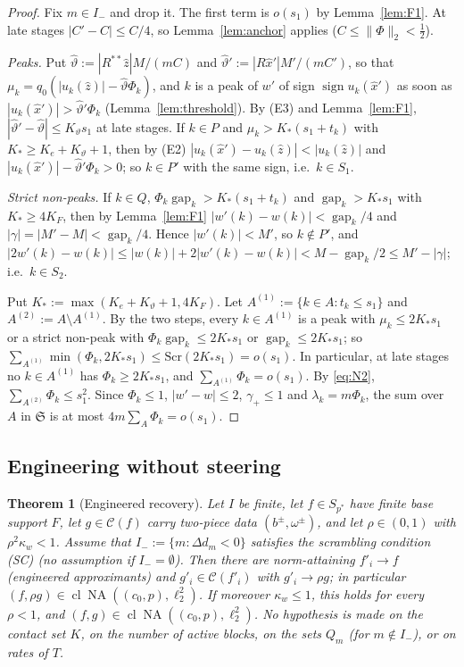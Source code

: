 \documentclass[10pt]{amsart}
\newtheorem{theorem}{Theorem}[section]
\theoremstyle{definition}
\theoremstyle{remark}
\newcommand{\NA}{\operatorname{NA}}
\newcommand{\sgn}{\operatorname{sign}}
\newcommand{\Cset}{\mathcal C}
\newcommand{\cl}{\operatorname{cl}}
\newcommand{\gap}{\operatorname{gap}}
\newcommand{\zh}{\hat z}
\begin{document}
\begin{proof}
Fix $m\in I_-$ and drop it.  The first term is $o(s_1)$ by
Lemma~\ref{lem:F1}.  At late stages $|C'-C|\le C/4$, so
Lemma~\ref{lem:anchor} applies ($C\le\|\Phi\|_2<\frac12$).

\emph{Peaks.}  Put $\hat\vartheta:=|R^{**}\zh|M/(mC)$ and $\hat\vartheta':=
|R\hat x'|M'/(mC')$, so that $\mu_k=q_0(|u_k(\zh)|-\hat\vartheta\Phi_k)$, and
$k$ is a peak of $w'$ of sign $\sgn u_k(\hat x')$ as soon as
$|u_k(\hat x')|>\hat\vartheta'\Phi_k$ (Lemma~\ref{lem:threshold}).  By (E3)
and Lemma~\ref{lem:F1}, $|\hat\vartheta'-\hat\vartheta|\le K_\vartheta s_1$
at late stages.  If $k\in P$ and $\mu_k>K_*(s_1+t_k)$ with $K_*\ge
K_e+K_\vartheta+1$, then by (E2) $|u_k(\hat x')-u_k(\zh)|<|u_k(\zh)|$ and
$|u_k(\hat x')|-\hat\vartheta'\Phi_k>0$; so $k\in P'$ with the same sign,
i.e.\ $k\in S_1$.

\emph{Strict non-peaks.}  If $k\in Q$, $\Phi_k\gap_k>K_*(s_1+t_k)$ and
$\gap_k>K_*s_1$ with $K_*\ge4K_F$, then by Lemma~\ref{lem:F1}
$|w'(k)-w(k)|<\gap_k/4$ and $|\gamma|=|M'-M|<\gap_k/4$.  Hence $|w'(k)|<M'$,
so $k\notin P'$, and $|2w'(k)-w(k)|\le|w(k)|+2|w'(k)-w(k)|<M-\gap_k/2\le
M'-|\gamma|$; i.e.\ $k\in S_2$.

Put $K_*:=\max(K_e+K_\vartheta+1,4K_F)$.  Let $A^{(1)}:=\{k\in A:t_k\le
s_1\}$ and $A^{(2)}:=A\setminus A^{(1)}$.  By the two steps, every $k\in
A^{(1)}$ is a peak with $\mu_k\le2K_*s_1$ or a strict non-peak with
$\Phi_k\gap_k\le2K_*s_1$ or $\gap_k\le2K_*s_1$; so
$\sum_{A^{(1)}}\min(\Phi_k,2K_*s_1)\le\mathrm{Scr}(2K_*s_1)=o(s_1)$.  In
particular, at late stages no $k\in A^{(1)}$ has $\Phi_k\ge2K_*s_1$, and
$\sum_{A^{(1)}}\Phi_k=o(s_1)$.  By \eqref{eq:N2}, $\sum_{A^{(2)}}\Phi_k\le
s_1^2$.  Since $\Phi_k\le1$, $|w'-w|\le2$, $\gamma_+\le1$ and
$\lambda_k=m\Phi_k$, the sum over $A$ in $\mathfrak S$ is at most
$4m\sum_A\Phi_k=o(s_1)$.
\end{proof}

\subsection{Engineering without steering}

\begin{theorem}[Engineered recovery]\label{thm:engineered}
Let $I$ be finite, let $f\in S_{p^*}$ have finite base support $F$, let
$g\in\Cset(f)$ carry two-piece data $(b^\pm,\omega^\pm)$, and let
$\rho\in(0,1)$ with $\rho^2\kappa_w<1$.  Assume that
$I_-:=\{m:\Delta d_m<0\}$ satisfies the scrambling condition \textup{(SC)}
\textup{(}no assumption if $I_-=\emptyset$\textup{)}.  Then there are
norm-attaining $f'_i\to f$ \textup{(}engineered approximants\textup{)} and
$g'_i\in\Cset(f'_i)$ with $g'_i\to\rho g$; in particular
$(f,\rho g)\in\cl\NA((c_0,p),\ell_2^2)$.  If moreover $\kappa_w\le1$, this
holds for every $\rho<1$, and $(f,g)\in\cl\NA((c_0,p),\ell_2^2)$.
No hypothesis is made on the contact set $K$, on the number of active
blocks, on the sets $Q_m$ \textup{(}for $m\notin I_-$\textup{)}, or on
rates of $T$.
\end{theorem}
\end{document}
